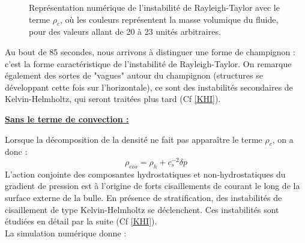 \documentclass{rapportECC}
\begin{document}
\begin{figure}[htb]
    \centering
    \hfill
    \caption{Représentation numérique de l'instabilité de Rayleigh-Taylor avec le terme $\rho_c$, où les couleurs représentent la masse volumique du fluide, pour des valeurs allant de 20 à 23 unités arbitraires.}
    \label{fig:images_cote_a_cote}
\end{figure}

Au bout de 85 secondes, nous arrivons à distinguer une forme de champignon : c'est la forme caractéristique de l'instabilité de Rayleigh-Taylor. On remarque également des sortes de "vagues" autour du champignon (structures se développant cette fois sur l'horizontale), ce sont des instabilités secondaires de Kelvin-Helmholtz, qui seront traitées plus tard (Cf \ref{KHI}).


\vspace{1 cm}


\underline{\textbf{Sans le terme de convection :}} 
\label{sans rhoc}
\vspace{0.5 cm}

Lorsque la décomposition de la densité ne fait pas apparaître le terme $\rho_c$, on a donc :
\begin{equation}
    \rho_{eos} = \rho_h + c_s^{-2}\delta p
\end{equation}
L'action conjointe des composantes hydrostatiques et non-hydrostatiques du gradient de pression est à l'origine de forts cisaillements de courant le long de la surface externe de la bulle. En présence de stratification, des instabilités de cisaillement de type Kelvin-Helmholtz se déclenchent. Ces instabilités sont étudiées en détail par la suite (Cf \ref{KHI}).
\\
La simulation numérique donne :
\end{document}
